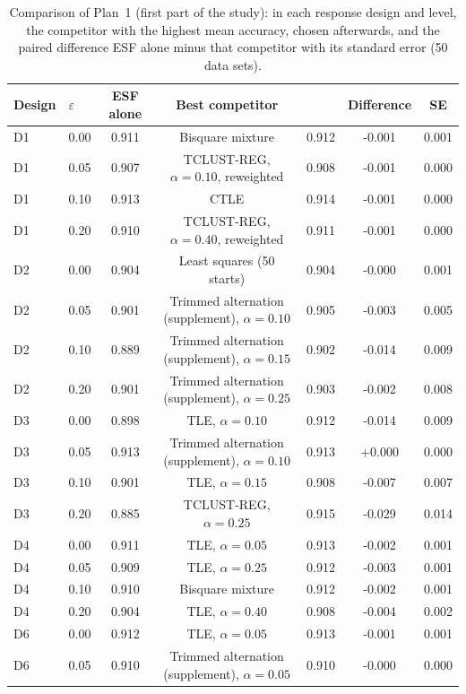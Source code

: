 \begin{table}[htbp]
\centering
\scriptsize
\caption{Comparison of Plan~1 (first part of the study): in each response design and level, the competitor with the highest mean accuracy, chosen afterwards, and the paired difference ESF alone minus that competitor with its standard error (50 data sets).}
\label{tab:S1}
\begin{tabular}{llcclcc}
\toprule
Design & $\varepsilon$ & ESF alone & Best competitor & & Difference & SE \\
\midrule
D1 & 0.00 & 0.911 & Bisquare mixture & 0.912 & -0.001 & 0.001 \\
D1 & 0.05 & 0.907 & TCLUST-REG, $\alpha=0.10$, reweighted & 0.908 & -0.001 & 0.000 \\
D1 & 0.10 & 0.913 & CTLE & 0.914 & -0.001 & 0.000 \\
D1 & 0.20 & 0.910 & TCLUST-REG, $\alpha=0.40$, reweighted & 0.911 & -0.001 & 0.000 \\
D2 & 0.00 & 0.904 & Least squares (50 starts) & 0.904 & -0.000 & 0.001 \\
D2 & 0.05 & 0.901 & Trimmed alternation (supplement), $\alpha=0.10$ & 0.905 & -0.003 & 0.005 \\
D2 & 0.10 & 0.889 & Trimmed alternation (supplement), $\alpha=0.15$ & 0.902 & -0.014 & 0.009 \\
D2 & 0.20 & 0.901 & Trimmed alternation (supplement), $\alpha=0.25$ & 0.903 & -0.002 & 0.008 \\
D3 & 0.00 & 0.898 & TLE, $\alpha=0.10$ & 0.912 & -0.014 & 0.009 \\
D3 & 0.05 & 0.913 & Trimmed alternation (supplement), $\alpha=0.10$ & 0.913 & +0.000 & 0.000 \\
D3 & 0.10 & 0.901 & TLE, $\alpha=0.15$ & 0.908 & -0.007 & 0.007 \\
D3 & 0.20 & 0.885 & TCLUST-REG, $\alpha=0.25$ & 0.915 & -0.029 & 0.014 \\
D4 & 0.00 & 0.911 & TLE, $\alpha=0.05$ & 0.913 & -0.002 & 0.001 \\
D4 & 0.05 & 0.909 & TLE, $\alpha=0.25$ & 0.912 & -0.003 & 0.001 \\
D4 & 0.10 & 0.910 & Bisquare mixture & 0.912 & -0.002 & 0.001 \\
D4 & 0.20 & 0.904 & TLE, $\alpha=0.40$ & 0.908 & -0.004 & 0.002 \\
D6 & 0.00 & 0.912 & TLE, $\alpha=0.05$ & 0.913 & -0.001 & 0.001 \\
D6 & 0.05 & 0.910 & Trimmed alternation (supplement), $\alpha=0.05$ & 0.910 & -0.000 & 0.000 \\

\end{tabular}
\end{table}
